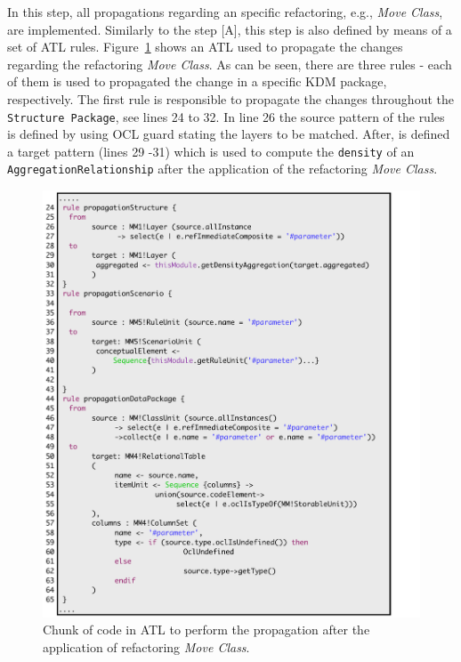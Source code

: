 In this step, all propagations regarding an specific refactoring, e.g., \textit{Move Class}, are implemented. Similarly to the step [A], this step is also defined by means of a set of ATL rules. Figure~\ref{fig:ATLPropagation} shows an ATL used to propagate the changes regarding the refactoring \textit{Move Class}. As can be seen, there are three rules - each of them is used to propagated the change in a specific KDM package, respectively. The first rule is responsible to propagate the changes throughout the \texttt{Structure Package}, see lines 24 to 32. In line 26 the source pattern of the rules is defined by using OCL guard stating the layers to be matched. After, is defined a target pattern (lines 29 -31) which is used to compute the \texttt{density} of an \texttt{AggregationRelationship} after the application of the refactoring \textit{Move Class}.

\begin{figure}[h]	
	\centering
	\includegraphics[scale=0.47]{figuras/propagationATLFormatted}
	\caption{Chunk of code in ATL to perform the propagation after the application of refactoring \textit{Move Class}.}
	\label{fig:ATLPropagation}
\end{figure}

